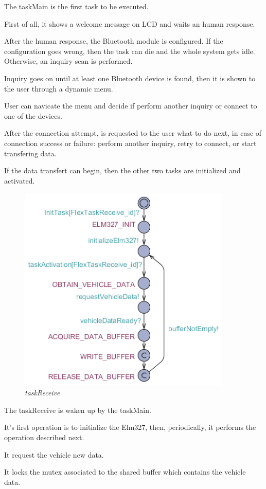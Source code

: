 \documentclass[paper=a4, fontsize=11pt]{scrartcl} %
\numberwithin{equation}{section} %
\numberwithin{figure}{section} %
\numberwithin{table}{section} %
\begin{document}
The taskMain is the first task to be executed.

First of all, it shows a welcome message on LCD and waits an human response.

After the human response, the Bluetooth module is configured. If the configuration goes wrong, then the task can die and the whole system gets idle. Otherwise, an inquiry scan is performed.

Inquiry goes on until at least one Bluetooth device is found, then it is shown to the user through a dynamic menu.

User can navicate the menu and decide if perform another inquiry or connect to one of the devices.

After the connection attempt, is requested to the user what to do next, in case of connection success or failure: perform another inquiry, retry to connect, or start transfering data.

If the data transfert can begin, then the other two tasks are initialized and activated.

\begin{figure}[H]
  \centering
  \includegraphics[width=4in]{img/FLEX-OBD-LCD_taskReceive}
  \caption{\textit{taskReceive}}
\end{figure}

The taskReceive is waken up by the taskMain.

It's first operation is to initialize the Elm327, then, periodically, it performs the operation described next.

It request the vehicle new data.

It locks the mutex associated to the shared buffer which contains the vehicle data.
\end{document}
